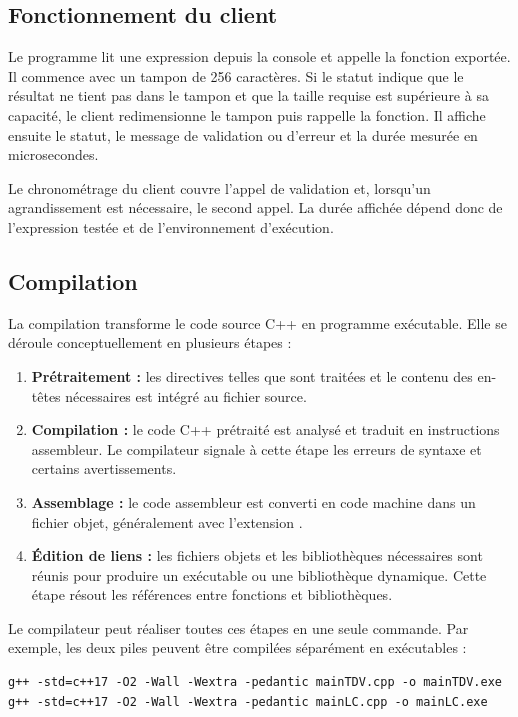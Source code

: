\documentclass[12pt,a4paper]{article}
\newcommand{\code}[1]{\texttt{\detokenize{#1}}}
\begin{document}
\subsection{Fonctionnement du client}

Le programme \code{client\_verification.cpp} lit une expression depuis la console et appelle la fonction exportée. Il commence avec un tampon de 256 caractères. Si le statut indique que le résultat ne tient pas dans le tampon et que la taille requise est supérieure à sa capacité, le client redimensionne le tampon puis rappelle la fonction. Il affiche ensuite le statut, le message de validation ou d'erreur et la durée mesurée en microsecondes.

Le chronométrage du client couvre l'appel de validation et, lorsqu'un agrandissement est nécessaire, le second appel. La durée affichée dépend donc de l'expression testée et de l'environnement d'exécution.

\subsection{Compilation}

 La compilation transforme le code source C++ en programme exécutable. Elle se déroule conceptuellement en plusieurs étapes :
 \begin{enumerate}
     \item \textbf{Prétraitement :} les directives telles que \code{#include} sont traitées et le contenu des en-têtes nécessaires est intégré au fichier source.
     \item \textbf{Compilation :} le code C++ prétraité est analysé et traduit en instructions assembleur. Le compilateur signale à cette étape les erreurs de syntaxe et certains avertissements.
     \item \textbf{Assemblage :} le code assembleur est converti en code machine dans un fichier objet, généralement avec l'extension \code{.o}.
     \item \textbf{Édition de liens :} les fichiers objets et les bibliothèques nécessaires sont réunis pour produire un exécutable ou une bibliothèque dynamique. Cette étape résout les références entre fonctions et bibliothèques.
 \end{enumerate}

 Le compilateur \code{g++} peut réaliser toutes ces étapes en une seule commande. Par exemple, les deux piles peuvent être compilées séparément en exécutables :

 \begin{lstlisting}[language={}]
g++ -std=c++17 -O2 -Wall -Wextra -pedantic mainTDV.cpp -o mainTDV.exe
g++ -std=c++17 -O2 -Wall -Wextra -pedantic mainLC.cpp -o mainLC.exe
 \end{lstlisting}
\end{document}
